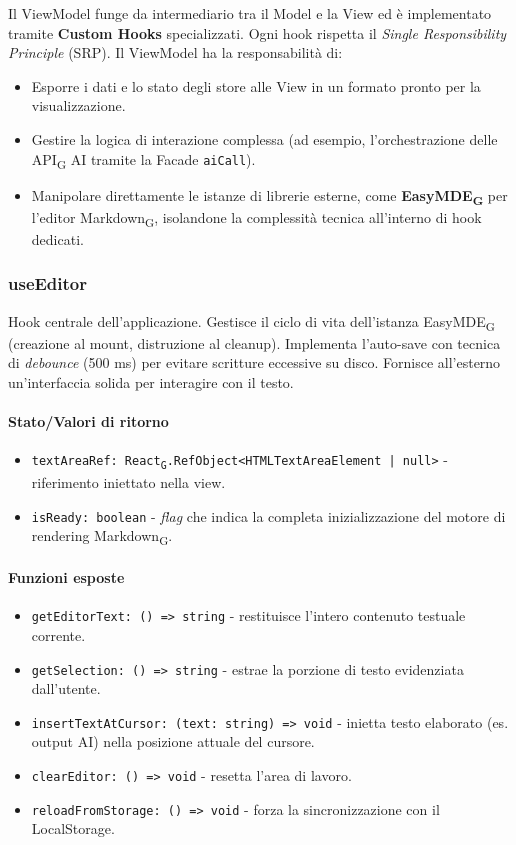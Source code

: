 \documentclass[11pt,a4paper]{article}
\newcommand{\gls}[1]{#1\textsubscript{G}}
\begin{document}
Il ViewModel funge da intermediario tra il Model e la View ed è implementato tramite \textbf{Custom Hooks} specializzati. Ogni hook rispetta il \textit{Single Responsibility Principle} (SRP).
Il ViewModel ha la responsabilità di:
\begin{itemize}
    \item Esporre i dati e lo stato degli store alle View in un formato pronto per la visualizzazione.
    \item Gestire la logica di interazione complessa (ad esempio, l'orchestrazione delle \gls{API} AI tramite la Facade \texttt{aiCall}).
    \item Manipolare direttamente le istanze di librerie esterne, come \textbf{\gls{EasyMDE}} per l'editor \gls{Markdown}, isolandone la complessità tecnica all'interno di hook dedicati.
\end{itemize}

\subsubsection{useEditor}
Hook centrale dell'applicazione. Gestisce il ciclo di vita dell'istanza \gls{EasyMDE} (creazione al mount, distruzione al cleanup). Implementa l'auto-save con tecnica di \textit{debounce} (500 ms) per evitare scritture eccessive su disco. Fornisce all'esterno un'interfaccia solida per interagire con il testo.

\paragraph{Stato/Valori di ritorno}
\begin{itemize}
    \item \texttt{textAreaRef: \gls{React}.RefObject<HTMLTextAreaElement | null>} - riferimento iniettato nella view.
    \item \texttt{isReady: boolean} - \textit{flag} che indica la completa inizializzazione del motore di rendering \gls{Markdown}.
\end{itemize}

\paragraph{Funzioni esposte}
\begin{itemize}
    \item \texttt{getEditorText: () => string} - restituisce l'intero contenuto testuale corrente.
    \item \texttt{getSelection: () => string} - estrae la porzione di testo evidenziata dall'utente.
    \item \texttt{insertTextAtCursor: (text: string) => void} - inietta testo elaborato (es. output AI) nella posizione attuale del cursore.
    \item \texttt{clearEditor: () => void} - resetta l'area di lavoro.
    \item \texttt{reloadFromStorage: () => void} - forza la sincronizzazione con il LocalStorage.
\end{itemize}
\end{document}
